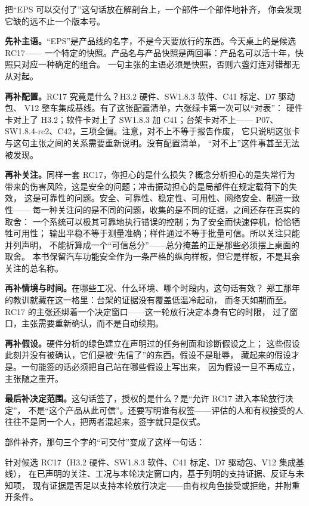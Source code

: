 把“EPS 可以交付了”这句话放在解剖台上，一个部件一个部件地补齐，
你会发现它缺的远不止一个版本号。

\textbf{先补主语。}“EPS”是产品线的名字，不是今天要放行的东西。今天桌上的是候选 RC17——
一个特定的快照。产品名与产品快照是两回事：产品名可以活十年，快照只对应一种确定的组合。
一句主张的主语必须是快照，否则六盏灯连对错都无从对起。

\textbf{再补配置。}RC17 究竟是什么？H3.2 硬件、SW1.8.3 软件、C41 标定、D7 驱动包、
V12 整车集成基线。有了这张配置清单，六张绿卡第一次可以“对表”：
硬件卡对上了 H3.2；软件卡对上了 SW1.8.3 加 C41；台架卡对不上——
P07、SW1.8.4-rc2、C42，三项全偏。注意，对不上不等于报告作废，
它只说明这张卡与这句主张之间的关系需要重新说明。没有配置清单，
“对不上”这件事甚至无法被发现。

\textbf{再补关注。}同样一套 RC17，你担心的是什么损失？概念分析担心的是失常行为
带来的伤害风险，这是安全的问题；冲击振动担心的是局部件在规定载荷下的失效，
这是可靠性的问题。安全、可靠性、稳定性、可用性、网络安全、制造一致性——
每一种关注问的是不同的问题，收集的是不同的证据，之间还存在真实的取舍：
一个系统可以极其可靠地执行错误的控制；为了安全而快速停机，恰恰牺牲可用性；
输出平稳不等于测量准确；样件通过不等于批量可信。所以关注只能并列声明，
不能折算成一个“可信总分”——总分掩盖的正是那些必须摆上桌面的取舍。
本书保留汽车功能安全作为一条严格的纵向样板，但它是样板，不是其余关注的总名称。

\textbf{再补情境与时间。}在哪些工况、什么环境、哪个时段内，这句话有效？
郑工那年的教训就藏在这一格里：台架的证据没有覆盖低温冷起动，
而冬天如期而至。RC17 的主张还绑着一个决定窗口——这一轮放行决定本身有它的时限，
过了窗口，主张需要重新确认，而不是自动续期。

\textbf{再补假设。}硬件分析的绿色建立在声明过的任务剖面和诊断假设之上；
这些假设此刻并没有被确认，它们是被“先信了”的东西。假设不是耻辱，
藏起来的假设才是。一句能签的话必须把自己站在哪些假设上写出来，
因为假设一旦不再成立，主张随之重开。

\textbf{最后补决定范围。}这句话签了，授权的是什么？是“允许 RC17 进入本轮放行决定”，
不是“这个产品从此可信”。还要写明谁有权签——评估的人和有权接受的人
往往不是同一个人，把两者混起来，签字就只是仪式。

部件补齐，那句三个字的“可交付”变成了这样一句话：

\begin{noteblock}
针对候选 RC17（H3.2 硬件、SW1.8.3 软件、C41 标定、D7 驱动包、V12 集成基线），
在已声明的关注、工况与本轮决定窗口内，基于列明的支持证据、反证与未知项，
现有证据是否足以支持本轮放行决定——由有权角色接受或拒绝，并附重开条件。
\end{noteblock}


